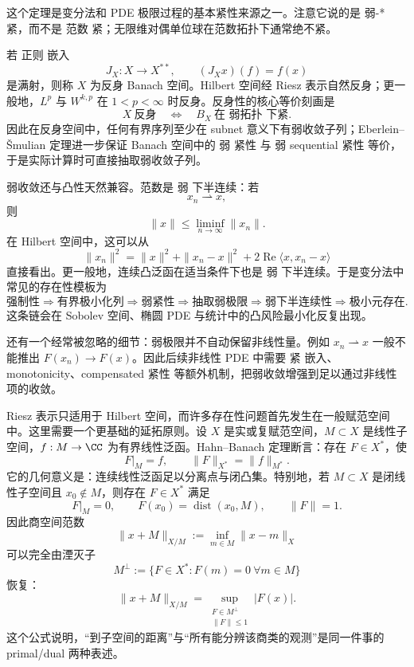 这个定理是变分法和 PDE 极限过程的基本紧性来源之一。注意它说的是 弱-* 紧，而不是 范数 紧；无限维对偶单位球在范数拓扑下通常绝不紧。

若 正则 嵌入
\[
J_X:X\to X^{**},
\qquad
(J_Xx)(f)=f(x)
\]
是满射，则称 $X$ 为反身 Banach 空间。Hilbert 空间经 Riesz 表示自然反身；更一般地，$L^p$ 与 $W^{k,p}$ 在 $1<p<\infty$ 时反身。反身性的核心等价刻画是
\begin{equation*}X\ \text{反身}
\quad\Longleftrightarrow\quad
B_X\ \text{在 弱拓扑 下紧}.\end{equation*}
因此在反身空间中，任何有界序列至少在 subnet 意义下有弱收敛子列；Eberlein--\v Smulian 定理进一步保证 Banach 空间中的 弱 紧性 与 弱 sequential 紧性 等价，于是实际计算时可直接抽取弱收敛子列。

弱收敛还与凸性天然兼容。范数是 弱 下半连续：若
\[
x_n\rightharpoonup x,
\]
则
\begin{equation*}\|x\|\le\liminf_{n\to\infty}\|x_n\|.\end{equation*}
在 Hilbert 空间中，这可以从
\[
\|x_n\|^2
=\|x\|^2+\|x_n-x\|^2
+2\operatorname{Re}\langle x,x_n-x\rangle
\]
直接看出。更一般地，连续凸泛函在适当条件下也是 弱 下半连续。于是变分法中常见的存在性模板为
\[
\text{强制性}
\Rightarrow
\text{有界极小化列}
\Rightarrow
\text{弱紧性}
\Rightarrow
\text{抽取弱极限}
\Rightarrow
\text{弱下半连续性}
\Rightarrow
\text{极小元存在}.
\]
这条链会在 Sobolev 空间、椭圆 PDE 与统计中的凸风险最小化反复出现。

还有一个经常被忽略的细节：弱极限并不自动保留非线性量。例如 $x_n\rightharpoonup x$ 一般不能推出 $F(x_n)\to F(x)$。因此后续非线性 PDE 中需要 紧 嵌入、monotonicity、compensated 紧性 等额外机制，把弱收敛增强到足以通过非线性项的收敛。

Riesz 表示只适用于 Hilbert 空间，而许多存在性问题首先发生在一般赋范空间中。这里需要一个更基础的延拓原则。设 $X$ 是实或复赋范空间，$M\subset X$ 是线性子空间，$f:M\to\CC$ 为有界线性泛函。Hahn--Banach 定理断言：存在 $F\in X^*$，使
\[
F|_M=f,
\qquad
\|F\|_{X^*}=\|f\|_{M^*}.
\]
它的几何意义是：连续线性泛函足以分离点与闭凸集。特别地，若 $M\subset X$ 是闭线性子空间且 $x_0\notin M$，则存在 $F\in X^*$ 满足
\[
F|_M=0,
\qquad
F(x_0)=\operatorname{dist}(x_0,M),
\qquad
\|F\|=1.
\]
因此商空间范数
\[
\|x+M\|_{X/M}:=\inf_{m\in M}\|x-m\|_X
\]
可以完全由湮灭子
\[
M^\perp:=\{F\in X^*:F(m)=0\ \forall m\in M\}
\]
恢复：
\[
{
\|x+M\|_{X/M}
=
\sup_{\substack{F\in M^\perp\\ \|F\|\le1}}|F(x)|
}.
\]
这个公式说明，``到子空间的距离''与``所有能分辨该商类的观测''是同一件事的 primal/dual 两种表述。

